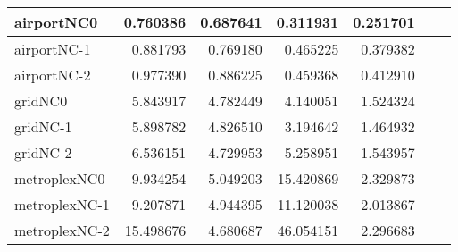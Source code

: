 \begin{longtable}{|l|r|r|r|r|r|r|}
airportNC0 & 0.760386 & 0.687641 & 0.311931 & 0.251701 \\ \hline
airportNC-1 & 0.881793 & 0.769180 & 0.465225 & 0.379382 \\ \hline
airportNC-2 & 0.977390 & 0.886225 & 0.459368 & 0.412910 \\ \hline
gridNC0 & 5.843917 & 4.782449 & 4.140051 & 1.524324 \\ \hline
gridNC-1 & 5.898782 & 4.826510 & 3.194642 & 1.464932 \\ \hline
gridNC-2 & 6.536151 & 4.729953 & 5.258951 & 1.543957 \\ \hline
metroplexNC0 & 9.934254 & 5.049203 & 15.420869 & 2.329873 \\ \hline
metroplexNC-1 & 9.207871 & 4.944395 & 11.120038 & 2.013867 \\ \hline
metroplexNC-2 & 15.498676 & 4.680687 & 46.054151 & 2.296683 \\ \hline
\end{longtable}
